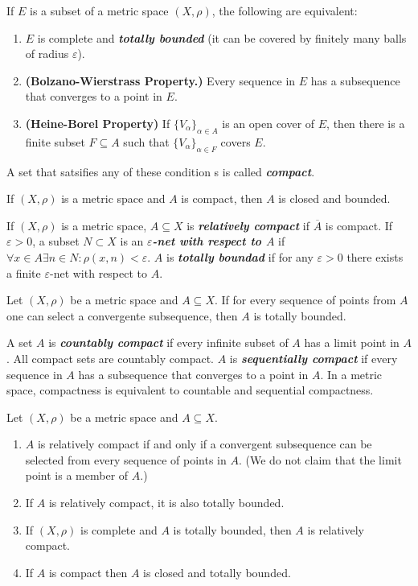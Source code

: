 \documentclass{article}
\theoremstyle{definition}
\numberwithin{equation}{section}
\begin{document}
	\begin{thm}
		If $E$ is a subset of a metric space $(X,\rho)$, the following are equivalent:
		\begin{enumerate}
			\item $E$ is complete and \textbf{\textit{totally bounded}} (it can be covered by finitely many balls of radius $\varepsilon$).
			\item \textbf{(Bolzano-Wierstrass Property.)} Every sequence in $E$ has a subsequence that converges to a point in $E$.
			\item \textbf{(Heine-Borel Property)} If $\{V_\alpha\}_{\alpha\in A}$ is an open cover of $E$, then there is a finite subset $F\subseteq A$ such that $\{V_\alpha\}_{\alpha\in F}$ covers $E$.
		\end{enumerate}
		A set that satsifies any of these condition
		s is called \textbf{\textit{compact}}.
	\end{thm}
	\begin{thm}
		If $(X,\rho)$ is a metric space and $A$ is compact, then $A$ is closed and bounded.
	\end{thm}
	If $(X,\rho)$ is a metric space, $A\subseteq X$ is \textbf{\textit{relatively compact}} if $\overline{A}$ is compact. If $\varepsilon>0$, a subset $N\subset X$ is an \textbf{\textit{$\varepsilon$-net with respect to $A$}} if $\forall x\in A\exists n\in N:\rho(x,n)<\varepsilon$. $A$ is \textbf{\textit{totally boundad}} if for any $\varepsilon>0$ there exists a finite $\varepsilon$-net with respect to $A$.
	
	\begin{thm}
		Let $(X,\rho)$ be a metric space and $A\subseteq X$. If for every sequence of points from $A$ one can select a convergente subsequence, then $A$ is totally bounded.
	\end{thm}
	A set $A$ is \textbf{\textit{countably compact}} if every infinite subset of $A$ has a limit point in $A$. All compact sets are countably compact. $A$ is \textbf{\textit{sequentially compact}} if every sequence in $A$ has a subsequence that converges to a point in $A$. In a metric space, compactness is equivalent to countable and sequential compactness.
	
	\begin{thm} \label{thm:compactness-properties} Let $(X,\rho)$ be a metric space and $A\subseteq X$.
		\begin{enumerate}
			\item $A$ is relatively compact if and only if a convergent subsequence can be selected from every sequence of points in $A$. (We do not claim that the limit point is a member of $A$.)
			\item If $A$ is relatively compact, it is also totally bounded.
			\item If $(X,\rho)$ is complete and $A$ is totally bounded, then $A$ is relatively compact.
			\item If $A$ is compact then $A$ is closed and totally bounded.
		\end{enumerate}
	\end{thm}
	
\end{document}

